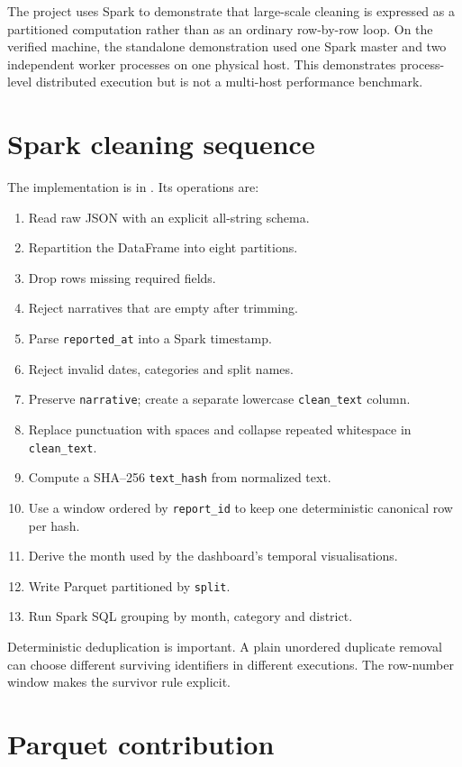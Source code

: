 \documentclass[12pt,a4paper]{report}
\newcommand{\code}[1]{\texttt{#1}}
\begin{document}
The project uses Spark to demonstrate that large-scale cleaning is expressed as a partitioned computation rather than as an ordinary row-by-row loop. On the verified machine, the standalone demonstration used one Spark master and two independent worker processes on one physical host. This demonstrates process-level distributed execution but is not a multi-host performance benchmark.

\section{Spark cleaning sequence}

The implementation is in . Its operations are:

\begin{enumerate}
  \item Read raw JSON with an explicit all-string schema.
  \item Repartition the DataFrame into eight partitions.
  \item Drop rows missing required fields.
  \item Reject narratives that are empty after trimming.
  \item Parse \code{reported\_at} into a Spark timestamp.
  \item Reject invalid dates, categories and split names.
  \item Preserve \code{narrative}; create a separate lowercase \code{clean\_text} column.
  \item Replace punctuation with spaces and collapse repeated whitespace in \code{clean\_text}.
  \item Compute a SHA--256 \code{text\_hash} from normalized text.
  \item Use a window ordered by \code{report\_id} to keep one deterministic canonical row per hash.
  \item Derive the month used by the dashboard's temporal visualisations.
  \item Write Parquet partitioned by \code{split}.
  \item Run Spark SQL grouping by month, category and district.
\end{enumerate}

Deterministic deduplication is important. A plain unordered duplicate removal can choose different surviving identifiers in different executions. The row-number window makes the survivor rule explicit.

\section{Parquet contribution}
\end{document}
